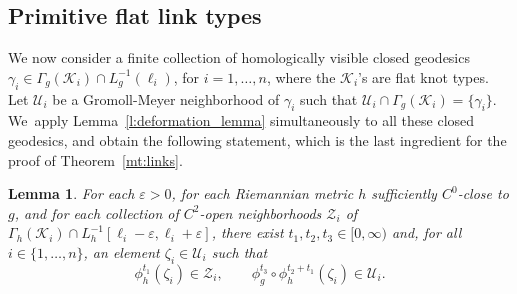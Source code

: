 \documentclass[11pt]{article}
\let\epsilon\varepsilon
\newcommand{\KK}{\mathcal{K}}
\newcommand{\UU}{\mathcal{U}}
\newcommand{\ZZ}{\mathcal{Z}}
\theoremstyle{plain}
\newtheorem{Lemma}[Thm]{Lemma}
\theoremstyle{definition}
\begin{document}
\subsection{Primitive flat link types}
We now consider a finite collection of homologically visible closed geodesics $\gamma_i\in\Gamma_g(\KK_i)\cap L_g^{-1}(\ell_i)$, for $i=1,\dots,n$, where the $\KK_i$'s are flat knot types. Let $\UU_i$ be a Gromoll-Meyer neighborhood of $\gamma_i$ such that $\UU_i\cap\Gamma_g(\KK_i)=\{\gamma_i\}$. We~apply Lemma~\ref{l:deformation_lemma} simultaneously to all these closed geodesics, and obtain the following statement, which is the last ingredient for the proof of Theorem~\ref{mt:links}.

\begin{Lemma}\label{l:intertwining}
For each $\epsilon>0$, for each Riemannian metric $h$ sufficiently $C^0$-close to $g$, and for each collection of $C^2$-open neighborhoods $\ZZ_i$ of $\Gamma_h(\KK_i)\cap L_h^{-1}[\ell_i-\epsilon,\ell_i+\epsilon]$, there exist $t_1,t_2,t_3\in[0,\infty)$ and, for all $i\in\{1,\dots,n\}$, an element $\zeta_i\in\UU_i$ such that
\[
\phi_h^{t_1}(\zeta_i)\in\ZZ_i,
\qquad
\phi_g^{t_3}\circ\phi_h^{t_2+t_1}(\zeta_i)\in\UU_i.
\]
\end{Lemma}
\end{document}
